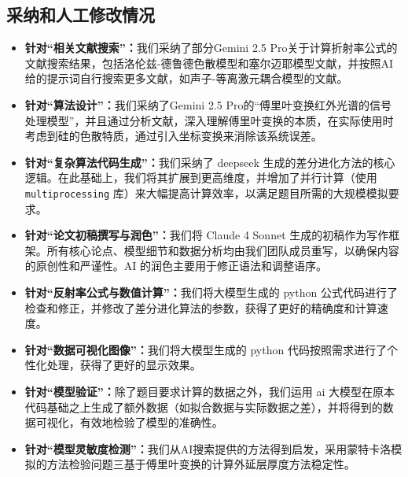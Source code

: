 \documentclass[a4paper]{ctexart}
\begin{document}
\subsection{采纳和人工修改情况}
\begin{itemize}
    \item \textbf{针对“相关文献搜索”：}我们采纳了部分Gemini 2.5 Pro关于计算折射率公式的文献搜索结果，包括洛伦兹-德鲁德色散模型和塞尔迈耶模型文献，并按照AI给的提示词自行搜索更多文献，如声子-等离激元耦合模型的文献。

    \item \textbf{针对“算法设计”：}我们采纳了Gemini 2.5 Pro的“傅里叶变换红外光谱的信号处理模型”，并且通过分析文献，深入理解傅里叶变换的本质，在实际使用时考虑到硅的色散特质，通过引入坐标变换来消除该系统误差。
    
    \item \textbf{针对“复杂算法代码生成”：}我们采纳了 deepseek 生成的差分进化方法的核心逻辑。在此基础上，我们将其扩展到更高维度，并增加了并行计算（使用 \texttt{multiprocessing} 库）来大幅提高计算效率，以满足题目所需的大规模模拟要求。

    \item \textbf{针对“论文初稿撰写与润色”：}我们将 Claude 4 Sonnet 生成的初稿作为写作框架。所有核心论点、模型细节和数据分析均由我们团队成员重写，以确保内容的原创性和严谨性。AI 的润色主要用于修正语法和调整语序。

    \item \textbf{针对“反射率公式与数值计算”：}我们将大模型生成的 python 公式代码进行了检查和修正，并修改了差分进化算法的参数，获得了更好的精确度和计算速度。

    \item \textbf{针对“数据可视化图像”：}我们将大模型生成的 python 代码按照需求进行了个性化处理，获得了更好的显示效果。

    \item \textbf{针对“模型验证”：}除了题目要求计算的数据之外，我们运用 ai 大模型在原本代码基础之上生成了额外数据（如拟合数据与实际数据之差），并将得到的数据可视化，有效地检验了模型的准确性。

    \item \textbf{针对“模型灵敏度检测”：}我们从AI搜索提供的方法得到启发，采用蒙特卡洛模拟的方法检验问题三基于傅里叶变换的计算外延层厚度方法稳定性。
\end{itemize}
\end{document}
